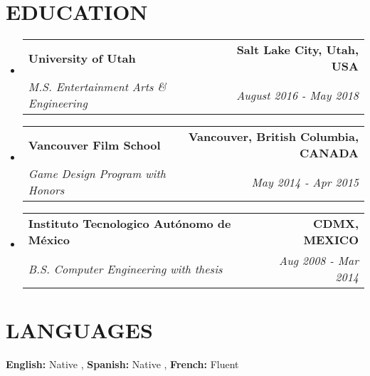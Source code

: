 \documentclass[letterpaper,11pt]{article}
\makeatletter
\newcommand{\resumeSubheading}[4]{
  \vspace{-2pt}\item
    \begin{tabular*}{1.0\textwidth}[t]{l@{\extracolsep{\fill}}r}
      \textbf{\large#1} & \textbf{\small #2} \\
      \textit{\large#3} & \textit{\small #4} \\
      
    \end{tabular*}\vspace{-7pt}
}
\newcommand{\resumeSubHeadingListStart}{\begin{itemize}[leftmargin=0.0in, label={}]}
\newcommand{\resumeSubHeadingListEnd}{\end{itemize}}
\makeatother
\begin{document}
\section{\color{airforceblue}EDUCATION}
\begin{adjustwidth}{.25in}{0in} %
\resumeSubHeadingListStart
  \resumeSubheading
    {University of Utah}{
      \hfill \small{Salt Lake City, Utah, USA} \hspace{14pt} %
    }
    {M.S. Entertainment Arts \& Engineering}{
      \hfill \small{August 2016 - May 2018} \hspace{14pt} %
    }
  \vspace{-4pt}
   \resumeSubheading
    {Vancouver Film School}{
      \hfill \small{Vancouver, British Columbia, CANADA} \hspace{14pt} %
    }
    {Game Design Program with Honors}{
      \hfill \small{May 2014 - Apr 2015} \hspace{14pt} %
    }
  \vspace{-4pt}
   \resumeSubheading
    {Instituto Tecnologico Autónomo de México}{
      \hfill \small{CDMX, MEXICO} \hspace{14pt} %
    }
    {B.S. Computer Engineering with thesis}{
      \hfill \small{Aug 2008 - Mar 2014} \hspace{14pt} %
    }
\resumeSubHeadingListEnd
\end{adjustwidth}
\vspace{-4pt}

\section{\color{airforceblue}LANGUAGES}
\begin{itemize}[leftmargin=0.25in, label={}]
  \small{\item{
   \textbf{\normalsize{English:}}{ \normalsize{Native}} ,
   \textbf{\normalsize{Spanish:}}{ \normalsize{Native}} ,
    \textbf{\normalsize{French:}}{ \normalsize{Fluent}}
   }}
\end{itemize}
\end{document}
